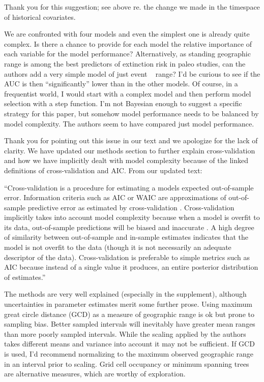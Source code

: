 \documentclass[12pt,letterpaper]{article}
\begin{document}
\begin{refsection}
Thank you for this suggestion; see above re. the change we made in the timespace of historical covariates.



\begin{bfseries}
  We are confronted with four models and even the simplest one is already quite complex. Is there a chance to provide for each model the relative importance of each variable for the model performance? Alternatively, as standing geographic range is among the best predictors of extinction risk in paleo studies, can the authors add a very simple model of just event ~ range? I’d be curious to see if the AUC is then “significantly” lower than in the other models. Of course, in a frequentist world, I would start with a complex model and then perform model selection with a step function. I’m not Bayesian enough to suggest a specific strategy for this paper, but somehow model performance needs to be balanced by model complexity. The authors seem to have compared just model performance.
\end{bfseries}

Thank you for pointing out this issue in our text and we apologize for the lack of clarity. We have updated our methods section to further explain cross-validation and how we have implicitly dealt with model complexity because of the linked definitions of cross-validation and AIC. From our updated text:

``Cross-validation is a procedure for estimating a models expected out-of-sample error. Information criteria such as AIC or WAIC are approximations of out-of-sample predictive error as estimated by cross-validation \citep{ESL,Gelman2013d}. Cross-validation implicitly takes into account model complexity because when a model is overfit to its data, out-of-sample predictions will be biased and inaccurate \citep{ESL}. A high degree of similarity between out-of-sample and in-sample estimates indicates that the model is not overfit to the data (though it is not necessarily an adequate descriptor of the data). Cross-validation is preferable to simple metrics such as AIC because instead of a single value it produces, an entire posterior distribution of estimates.''

\begin{bfseries}
  The methods are very well explained (especially in the supplement), although uncertainties in parameter estimates merit some further prose. Using maximum great circle distance (GCD) as a measure of geographic range is ok but prone to sampling bias. Better sampled intervals will inevitably have greater mean ranges than more poorly sampled intervals. While the scaling applied by the authors takes different means and variance into account it may not be sufficient. If GCD is used, I’d recommend normalizing to the maximum observed geographic range in an interval prior to scaling. Grid cell occupancy or minimum spanning trees are alternative measures, which are worthy of exploration. 
\end{bfseries}



\end{refsection}
\end{document}
